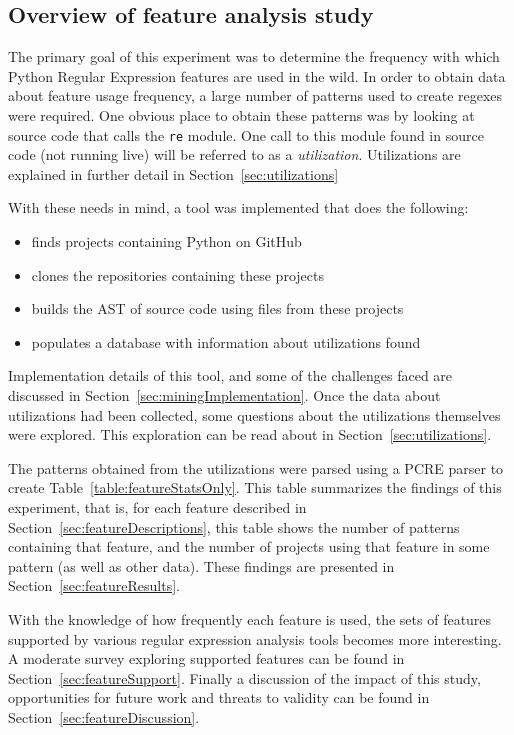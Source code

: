 \subsection{Overview of feature analysis study}

The primary goal of this experiment was to determine the frequency with which Python Regular Expression features are used in the wild.  In order to obtain data about feature usage frequency, a large number of patterns used to create regexes were required.  One obvious place to obtain these patterns was by looking at source code that calls the {\tt re} module.  One call to this module found in source code (not running live) will be referred to as a \emph{utilization}.  Utilizations are explained in further detail in Section~\ref{sec:utilizations}

With these needs in mind, a tool was implemented that does the following:
\begin{itemize} \itemsep -1pt
\item finds projects containing Python on GitHub
\item clones the repositories containing these projects
\item builds the AST of source code using files from these projects
\item populates a database with information about utilizations found
\end{itemize}

Implementation details of this tool, and some of the challenges faced are discussed in Section~\ref{sec:miningImplementation}.  Once the data about utilizations had been collected, some questions about the utilizations themselves were explored.  This exploration can be read about in Section~\ref{sec:utilizations}.

The patterns obtained from the utilizations were parsed using a PCRE parser to create Table~\ref{table:featureStatsOnly}.  This table summarizes the findings of this experiment, that is, for each feature described in Section~\ref{sec:featureDescriptions}, this table shows the number of patterns containing that feature, and the number of projects using that feature in some pattern (as well as other data).  These findings are presented in Section~\ref{sec:featureResults}.

With the knowledge of how frequently each feature is used, the sets of features supported by various regular expression analysis tools becomes more interesting.  A moderate survey exploring supported features can be found in Section~\ref{sec:featureSupport}.  Finally a discussion of the impact of this study, opportunities for future work and threats to validity can be found in Section~\ref{sec:featureDiscussion}.
